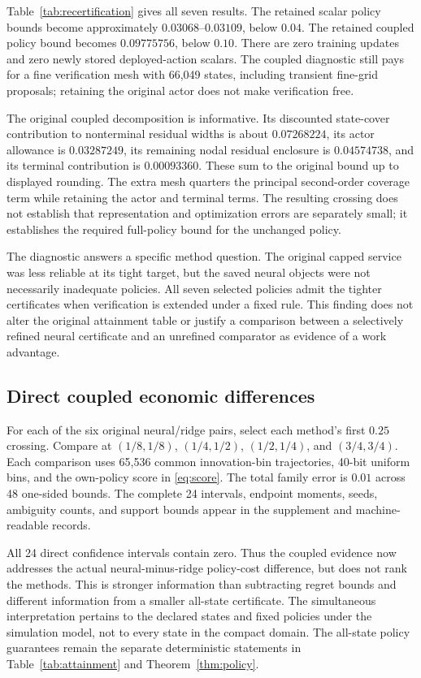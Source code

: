 \documentclass[ecta,nameyear,draft]{econsocart}
\begin{document}
Table~\ref{tab:recertification} gives all seven results. The retained scalar policy bounds become approximately $0.03068$--$0.03109$, below $0.04$. The retained coupled policy bound becomes $0.09775756$, below $0.10$. There are zero training updates and zero newly stored deployed-action scalars. The coupled diagnostic still pays for a fine verification mesh with 66,049 states, including transient fine-grid proposals; retaining the original actor does not make verification free.

The original coupled decomposition is informative. Its discounted state-cover contribution to nonterminal residual widths is about $0.07268224$, its actor allowance is $0.03287249$, its remaining nodal residual enclosure is $0.04574738$, and its terminal contribution is $0.00093360$. These sum to the original bound up to displayed rounding. The extra mesh quarters the principal second-order coverage term while retaining the actor and terminal terms. The resulting crossing does not establish that representation and optimization errors are separately small; it establishes the required full-policy bound for the unchanged policy.

The diagnostic answers a specific method question. The original capped service was less reliable at its tight target, but the saved neural objects were not necessarily inadequate policies. All seven selected policies admit the tighter certificates when verification is extended under a fixed rule. This finding does not alter the original attainment table or justify a comparison between a selectively refined neural certificate and an unrefined comparator as evidence of a work advantage.

\subsection{Direct coupled economic differences}

For each of the six original neural/ridge pairs, select each method's first $0.25$ crossing. Compare at $(1/8,1/8)$, $(1/4,1/2)$, $(1/2,1/4)$, and $(3/4,3/4)$. Each comparison uses 65,536 common innovation-bin trajectories, 40-bit uniform bins, and the own-policy score in \eqref{eq:score}. The total family error is $0.01$ across 48 one-sided bounds. The complete 24 intervals, endpoint moments, seeds, ambiguity counts, and support bounds appear in the supplement and machine-readable records.

All 24 direct confidence intervals contain zero. Thus the coupled evidence now addresses the actual neural-minus-ridge policy-cost difference, but does not rank the methods. This is stronger information than subtracting regret bounds and different information from a smaller all-state certificate. The simultaneous interpretation pertains to the declared states and fixed policies under the simulation model, not to every state in the compact domain. The all-state policy guarantees remain the separate deterministic statements in Table~\ref{tab:attainment} and Theorem~\ref{thm:policy}.
\end{document}
